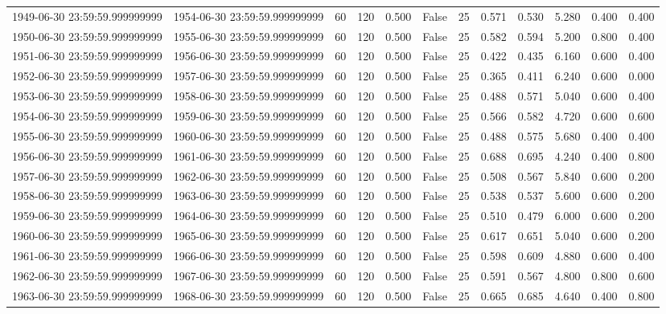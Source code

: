 \begin{table}
\begin{tabular}{lccccccccccc}
1949-06-30 23:59:59.999999999 & 1954-06-30 23:59:59.999999999 & 60 & 120 & 0.500 & False & 25 & 0.571 & 0.530 & 5.280 & 0.400 & 0.400 \\
1950-06-30 23:59:59.999999999 & 1955-06-30 23:59:59.999999999 & 60 & 120 & 0.500 & False & 25 & 0.582 & 0.594 & 5.200 & 0.800 & 0.400 \\
1951-06-30 23:59:59.999999999 & 1956-06-30 23:59:59.999999999 & 60 & 120 & 0.500 & False & 25 & 0.422 & 0.435 & 6.160 & 0.600 & 0.400 \\
1952-06-30 23:59:59.999999999 & 1957-06-30 23:59:59.999999999 & 60 & 120 & 0.500 & False & 25 & 0.365 & 0.411 & 6.240 & 0.600 & 0.000 \\
1953-06-30 23:59:59.999999999 & 1958-06-30 23:59:59.999999999 & 60 & 120 & 0.500 & False & 25 & 0.488 & 0.571 & 5.040 & 0.600 & 0.400 \\
1954-06-30 23:59:59.999999999 & 1959-06-30 23:59:59.999999999 & 60 & 120 & 0.500 & False & 25 & 0.566 & 0.582 & 4.720 & 0.600 & 0.600 \\
1955-06-30 23:59:59.999999999 & 1960-06-30 23:59:59.999999999 & 60 & 120 & 0.500 & False & 25 & 0.488 & 0.575 & 5.680 & 0.400 & 0.400 \\
1956-06-30 23:59:59.999999999 & 1961-06-30 23:59:59.999999999 & 60 & 120 & 0.500 & False & 25 & 0.688 & 0.695 & 4.240 & 0.400 & 0.800 \\
1957-06-30 23:59:59.999999999 & 1962-06-30 23:59:59.999999999 & 60 & 120 & 0.500 & False & 25 & 0.508 & 0.567 & 5.840 & 0.600 & 0.200 \\
1958-06-30 23:59:59.999999999 & 1963-06-30 23:59:59.999999999 & 60 & 120 & 0.500 & False & 25 & 0.538 & 0.537 & 5.600 & 0.600 & 0.200 \\
1959-06-30 23:59:59.999999999 & 1964-06-30 23:59:59.999999999 & 60 & 120 & 0.500 & False & 25 & 0.510 & 0.479 & 6.000 & 0.600 & 0.200 \\
1960-06-30 23:59:59.999999999 & 1965-06-30 23:59:59.999999999 & 60 & 120 & 0.500 & False & 25 & 0.617 & 0.651 & 5.040 & 0.600 & 0.200 \\
1961-06-30 23:59:59.999999999 & 1966-06-30 23:59:59.999999999 & 60 & 120 & 0.500 & False & 25 & 0.598 & 0.609 & 4.880 & 0.600 & 0.400 \\
1962-06-30 23:59:59.999999999 & 1967-06-30 23:59:59.999999999 & 60 & 120 & 0.500 & False & 25 & 0.591 & 0.567 & 4.800 & 0.800 & 0.600 \\
1963-06-30 23:59:59.999999999 & 1968-06-30 23:59:59.999999999 & 60 & 120 & 0.500 & False & 25 & 0.665 & 0.685 & 4.640 & 0.400 & 0.800 \\

\end{tabular}
\end{table}
